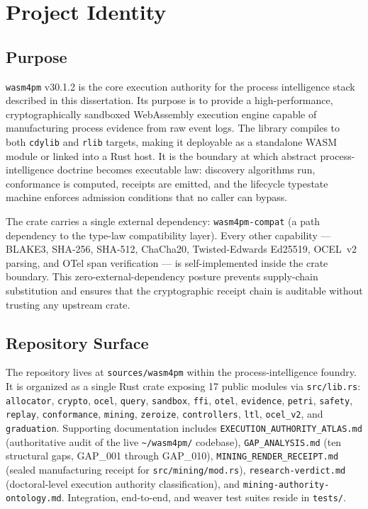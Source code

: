 \section{Project Identity}
\label{sec:sources-wasm4pm-identity}

\subsection{Purpose}
\label{sec:sources-wasm4pm-identity-purpose}

\texttt{wasm4pm} v30.1.2 is the core execution authority for the process intelligence stack described
in this dissertation. Its purpose is to provide a high-performance, cryptographically sandboxed
WebAssembly execution engine capable of manufacturing process evidence from raw event logs.
The library compiles to both \texttt{cdylib} and \texttt{rlib} targets, making it deployable as a
standalone WASM module or linked into a Rust host. It is the boundary at which abstract
process-intelligence doctrine becomes executable law: discovery algorithms run, conformance is
computed, receipts are emitted, and the lifecycle typestate machine enforces admission conditions
that no caller can bypass.

The crate carries a single external dependency: \texttt{wasm4pm-compat} (a path dependency to the
type-law compatibility layer). Every other capability — BLAKE3, SHA-256, SHA-512, ChaCha20,
Twisted-Edwards Ed25519, OCEL~v2 parsing, and OTel span verification — is self-implemented inside
the crate boundary. This zero-external-dependency posture prevents supply-chain substitution and
ensures that the cryptographic receipt chain is auditable without trusting any upstream crate.

\subsection{Repository Surface}
\label{sec:sources-wasm4pm-identity-surface}

The repository lives at \texttt{sources/wasm4pm} within the process-intelligence foundry.
It is organized as a single Rust crate exposing 17 public modules via \texttt{src/lib.rs}:
\texttt{allocator}, \texttt{crypto}, \texttt{ocel}, \texttt{query}, \texttt{sandbox}, \texttt{ffi},
\texttt{otel}, \texttt{evidence}, \texttt{petri}, \texttt{safety}, \texttt{replay},
\texttt{conformance}, \texttt{mining}, \texttt{zeroize}, \texttt{controllers}, \texttt{ltl},
\texttt{ocel\_v2}, and \texttt{graduation}. Supporting documentation includes
\texttt{EXECUTION\_AUTHORITY\_ATLAS.md} (authoritative audit of the live \texttt{\textasciitilde/wasm4pm/} codebase),
\texttt{GAP\_ANALYSIS.md} (ten structural gaps, GAP\_001 through GAP\_010), \texttt{MINING\_RENDER\_RECEIPT.md}
(sealed manufacturing receipt for \texttt{src/mining/mod.rs}), \texttt{research-verdict.md}
(doctoral-level execution authority classification), and \texttt{mining-authority-ontology.md}.
Integration, end-to-end, and weaver test suites reside in \texttt{tests/}.

